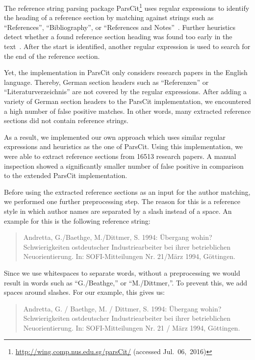 The reference string parsing package ParsCit\footnote{\url{http://wing.comp.nus.edu.sg/parsCit/} (accessed Jul.~06,~2016)} uses regular expressions to identify the heading of a reference section by matching against strings such as ``References'', ``Bibliography'', or ``References and Notes''~\citep{councill2008parscit}.
Further heuristics detect whether a found reference section heading was found too early in the text~\citep{councill2008parscit}.
After the start is identified, another regular expression is used to search for the end of the reference section.

Yet, the implementation in ParsCit only considers research papers in the English language.
Thereby, German section headers such as ``Referenzen'' or ``Literaturverzeichnis'' are not covered by the regular expressions.
After adding a variety of German section headers to the ParsCit implementation, we encountered a high number of false positive matches.
In other words, many extracted reference sections did not contain reference strings.

As a result, we implemented our own approach which uses similar regular expressions and heuristics as the one of ParsCit.
Using this implementation, we were able to extract reference sections from \num{16513} research papers.
A manual inspection showed a significantly smaller number of false positive in comparison to the extended ParsCit implementation.

\bigskip

Before using the extracted reference sections as an input for the author matching, we performed one further preprocessing step.
The reason for this is a reference style in which author names are separated by a slash instead of a space.
An example for this is the following reference string:
\begin{quote}
  Andretta, G./Baethge, M./Dittmer, S. 1994: Übergang wohin? Schwierigkeiten ostdeutscher Industriearbeiter bei ihrer betrieblichen Neuorientierung. In: SOFI-Mitteilungen Nr. 21/März 1994, Göttingen.
\end{quote}
Since we use whitespaces to separate words, without a preprocessing we would result in words such as ``G./Beathge,{}'' or ``M./Dittmer,{}''.
To prevent this, we add spaces around slashes.
For our example, this gives us:
\begin{quote}
  Andretta, G. / Baethge, M. / Dittmer, S. 1994: Übergang wohin? Schwierigkeiten ostdeutscher Industriearbeiter bei ihrer betrieblichen Neuorientierung. In: SOFI-Mitteilungen Nr. 21 / März 1994, Göttingen.
\end{quote}

